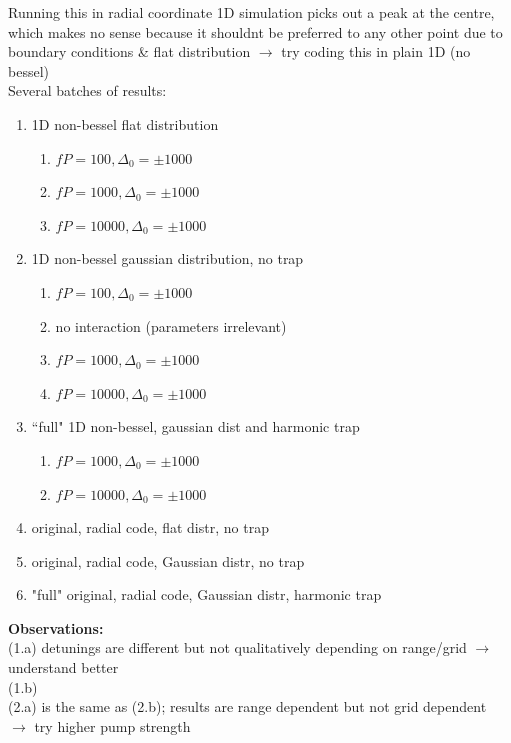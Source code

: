 \documentclass[a4paper,nobalancelastpage]{revtex4-1}
\begin{document}
Running this in radial coordinate 1D simulation picks out a peak at the centre, which makes no sense because it shouldnt be preferred to any other point due to boundary conditions \& flat distribution $\rightarrow$ try coding this in plain 1D (no bessel)\\

Several batches of results:
\begin{enumerate}
\item 1D non-bessel flat distribution
\begin{enumerate}
\item $fP=100, \Delta_0=\pm 1000$
\item $fP=1000, \Delta_0=\pm 1000$
\item $fP=10000, \Delta_0=\pm 1000$
\end{enumerate}
\item 1D non-bessel gaussian distribution, no trap
\begin{enumerate}
\item $fP=100, \Delta_0=\pm 1000$
\item no interaction (parameters irrelevant)
\item $fP=1000, \Delta_0=\pm 1000$
\item $fP=10000, \Delta_0=\pm 1000$
\end{enumerate}
\item ``full" 1D non-bessel, gaussian dist and harmonic trap
\begin{enumerate}
\item $fP=1000, \Delta_0=\pm 1000$
\item $fP=10000, \Delta_0=\pm 1000$
\end{enumerate}
\item original, radial code, flat distr, no trap
\item original, radial code, Gaussian distr, no trap
\item "full" original, radial code, Gaussian distr, harmonic trap
\end{enumerate}

\textbf{Observations:}\\

(1.a) detunings are different but not qualitatively depending on range/grid $\rightarrow$ understand better\\

(1.b) \\

(2.a) is the same as (2.b); results are range dependent but not grid dependent $\rightarrow$ try higher pump strength\\
\end{document}
